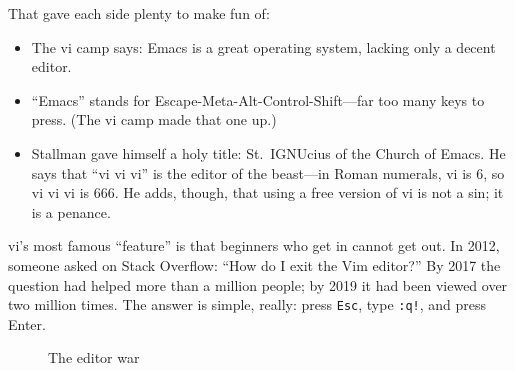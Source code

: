 That gave each side plenty to make fun of:
\begin{itemize}
  \item The vi camp says: Emacs is a great operating system, lacking only a decent editor.
  \item ``Emacs'' stands for Escape-Meta-Alt-Control-Shift---far too many keys to press. (The vi camp made that one up.)
  \item Stallman gave himself a holy title: St.~IGNUcius of the Church of Emacs. He says that ``vi vi vi'' is the editor of the beast---in Roman numerals, vi is 6, so vi vi vi is 666. He adds, though, that using a free version of vi is not a sin; it is a penance.
\end{itemize}

vi's most famous ``feature'' is that beginners who get in cannot get out. In 2012, someone asked on Stack Overflow: ``How do I exit the Vim editor?'' By 2017 the question had helped more than a million people; by 2019 it had been viewed over two million times. The answer is simple, really: press \texttt{Esc}, type \texttt{:q!}, and press Enter.

\begin{figure}[htbp]
  \centering
  \caption{The editor war}
  \label{fig:editors}
\end{figure}

